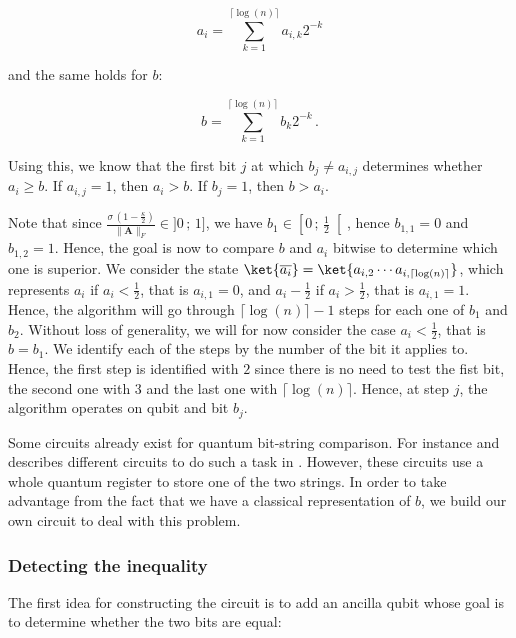 \documentclass[11pt, a4paper]{article}
\begin{document}
                \[a_i=\sum_{k=1}^{\lceil\log(n)\rceil}a_{i,k}2^{-k}\]
                
                and the same holds for \(b\):
                
                \[b=\sum_{k=1}^{\lceil\log(n)\rceil}b_{k}2^{-k}\,.\]
                
                Using this, we know that the first bit \(j\) at which \(b_j\neq a_{i,j}\) determines whether \(a_i\geqslant b\). If \(a_{i,j}=1\), then \(a_i>b\). If \(b_j=1\), then \(b>a_i\).
                
                Note that since \(\frac{\sigma\,\left(1 - \frac\kappa2\right)}{\|\mathbf{A}\|_F}\in]0\,;\,1]\), we have \(b_1\in\left[0\,;\,\frac12\right[\), hence \(b_{1,1}=0\) and \(b_{1,2}=1\). Hence, the goal is now to compare \(b\) and \(a_i\) bitwise to determine which one is superior. We consider the state \(\ket{\overline{a_i}} = \ket{a_{i,2}\cdots a_{i,\lceil\log(n)\rceil}}\), which represents \(a_i\) if \(a_i<\frac12\), that is \(a_{i,1}=0\), and \(a_i-\frac12\) if \(a_i>\frac12\), that is \(a_{i, 1} = 1\). Hence, the algorithm will go through \(\lceil\log(n)\rceil - 1\) steps for each one of \(b_1\) and \(b_2\). Without loss of generality, we will for now consider the case \(a_i<\frac12\), that is \(b=b_1\). We identify each of the steps by the number of the bit it applies to. Hence, the first step is identified with \(2\) since there is no need to test the fist bit, the second one with \(3\) and the last one with \(\lceil\log(n)\rceil\). Hence, at step \(j\), the algorithm operates on qubit  and bit \(b_j\).
                
                Some circuits already exist for quantum bit-string comparison. For instance \citeauthor{QBSC} and describes different circuits to do such a task in \cite{QBSC}. However, these circuits use a whole quantum register to store one of the two strings. In order to take advantage from the fact that we have a classical representation of \(b\), we build our own circuit to deal with this problem.
                
            \subsubsection{Detecting the inequality}
                The first idea for constructing the circuit is to add an ancilla qubit whose goal is to determine whether the two bits are equal:
                
\end{document}
